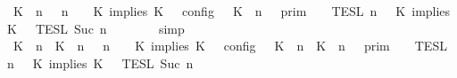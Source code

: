 \begin{isabellebody}
\ {\isacartoucheopen}{\isasymlbrakk}\ {\isacharparenleft}{\isacharparenleft}K\ {\isasymnot}{\isasymUp}\ n{\isacharparenright}\ {\isacharhash}\ {\isasymGamma}{\isacharparenright}{\isacharcomma}\ n\ {\isasymturnstile}\ {\isasymPsi}\ {\isasymtriangleright}\ {\isacharparenleft}{\isacharparenleft}K\ implies\ K\ {\isacharhash}\ {\isasymPhi}{\isacharparenright}\ {\isasymrbrakk}\isactrlsub c\isactrlsub o\isactrlsub n\isactrlsub f\isactrlsub i\isactrlsub g\ {\isacharequal}\ {\isasymlbrakk}{\isasymlbrakk}\ {\isacharparenleft}K\ {\isasymnot}{\isasymUp}\ n{\isacharparenright}\ {\isacharhash}\ {\isasymGamma}\ {\isasymrbrakk}{\isasymrbrakk}\isactrlsub p\isactrlsub r\isactrlsub i\isactrlsub m\ {\isasyminter}\ {\isasymlbrakk}{\isasymlbrakk}\ {\isasymPsi}\ {\isasymrbrakk}{\isasymrbrakk}\isactrlsub T\isactrlsub E\isactrlsub S\isactrlsub L\isactrlbsup {\isasymge}\ n\isactrlesup \ {\isasyminter}\ {\isasymlbrakk}{\isasymlbrakk}\ {\isacharparenleft}K\ implies\ K\ {\isacharhash}\ {\isasymPhi}\ {\isasymrbrakk}{\isasymrbrakk}\isactrlsub T\isactrlsub E\isactrlsub S\isactrlsub L\isactrlbsup {\isasymge}\ Suc\ n\isactrlesup {\isacartoucheclose}\isanewline
\ \ \ \ \ \ \isamarkupfalse%
\ simp\isanewline
\ \ \ \ \isamarkupfalse%
\ \isamarkupfalse%
\ {\isacartoucheopen}{\isasymlbrakk}\ {\isacharparenleft}{\isacharparenleft}K\ {\isasymUp}\ n{\isacharparenright}\ {\isacharhash}\ {\isacharparenleft}K\ {\isasymUp}\ n{\isacharparenright}\ {\isacharhash}\ {\isasymGamma}{\isacharparenright}{\isacharcomma}\ n\ {\isasymturnstile}\ {\isasymPsi}\ {\isasymtriangleright}\ {\isacharparenleft}{\isacharparenleft}K\ implies\ K\ {\isacharhash}\ {\isasymPhi}{\isacharparenright}\ {\isasymrbrakk}\isactrlsub c\isactrlsub o\isactrlsub n\isactrlsub f\isactrlsub i\isactrlsub g\ {\isacharequal}\ {\isasymlbrakk}{\isasymlbrakk}\ {\isacharparenleft}{\isacharparenleft}K\ {\isasymUp}\ n{\isacharparenright}\ {\isacharhash}\ {\isacharparenleft}K\ {\isasymUp}\ n{\isacharparenright}\ {\isacharhash}\ {\isasymGamma}{\isacharparenright}\ {\isasymrbrakk}{\isasymrbrakk}\isactrlsub p\isactrlsub r\isactrlsub i\isactrlsub m\ {\isasyminter}\ {\isasymlbrakk}{\isasymlbrakk}\ {\isasymPsi}\ {\isasymrbrakk}{\isasymrbrakk}\isactrlsub T\isactrlsub E\isactrlsub S\isactrlsub L\isactrlbsup {\isasymge}\ n\isactrlesup \ {\isasyminter}\ {\isasymlbrakk}{\isasymlbrakk}\ {\isacharparenleft}K\ implies\ K\ {\isacharhash}\ {\isasymPhi}\ {\isasymrbrakk}{\isasymrbrakk}\isactrlsub T\isactrlsub E\isactrlsub S\isactrlsub L\isactrlbsup {\isasymge}\ Suc\ n\isactrlesup {\isacartoucheclose}\isanewline

\end{isabellebody}
